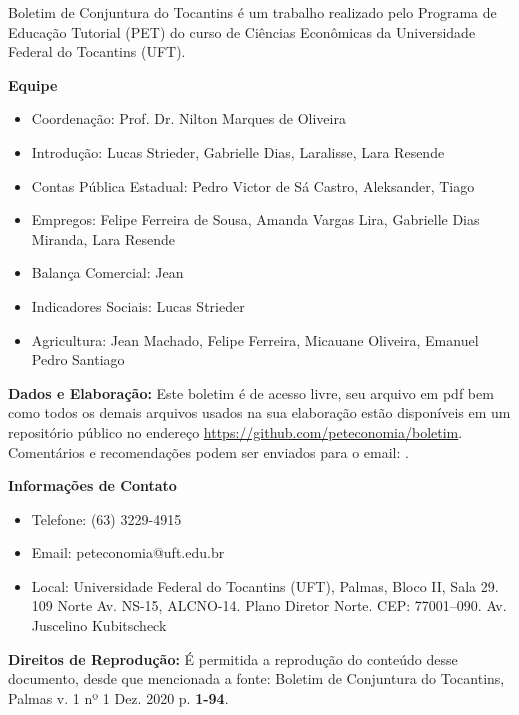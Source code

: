 \begin{tcolorbox}[colback=boxbackground, colframe=boxbackground, arc=0mm, top=15pt]
Boletim de Conjuntura do Tocantins é um trabalho realizado pelo Programa de Educação Tutorial (PET) do curso de Ciências Econômicas da Universidade Federal do Tocantins (UFT).
\\
\par{\bf Equipe}
\begin{itemize}
	\item Coordenação: Prof. Dr. Nilton Marques de Oliveira
	\item Introdução: Lucas Strieder, Gabrielle Dias, Laralisse, Lara Resende
	\item Contas Pública Estadual: Pedro Victor de Sá Castro, Aleksander, Tiago
	\item Empregos: Felipe Ferreira de Sousa, Amanda Vargas Lira, Gabrielle Dias Miranda, Lara Resende
	\item Balança Comercial: Jean
	\item Indicadores Sociais: Lucas Strieder
	\item Agricultura: Jean Machado, Felipe Ferreira, Micauane Oliveira, Emanuel Pedro Santiago
\end{itemize}
\par{\bf Dados e Elaboração:}
Este boletim é de acesso livre, seu arquivo em pdf bem como todos os demais arquivos usados na sua elaboração estão disponíveis em um repositório público no endereço \url{https://github.com/peteconomia/boletim}. Comentários e recomendações podem ser enviados para o email: .
\\
\par{\bf Informações de Contato}
\begin{itemize}
	\item{Telefone:} (63) 3229-4915
	\item{Email: peteconomia@uft.edu.br} 
	\item{Local:} Universidade Federal do Tocantins (UFT), Palmas, Bloco II, Sala 29. 109 Norte Av. NS-15, ALCNO-14. Plano Diretor Norte. CEP: 77001--090. Av. Juscelino Kubitscheck
\end{itemize}
\par{\bf Direitos de Reprodução:}
É permitida a reprodução do conteúdo desse documento, desde que mencionada a fonte: Boletim de Conjuntura do Tocantins, Palmas v. 1 nº 1 Dez. 2020 p. \textbf{1-94}.
\end{tcolorbox}



